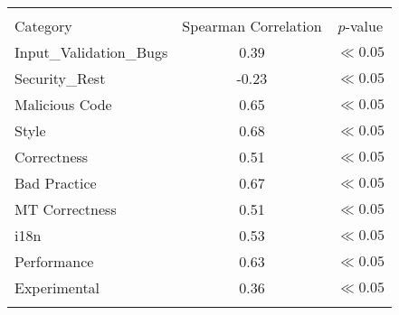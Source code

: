 
\begin{tabular}{lcc}
\hline \\
Category & Spearman Correlation & $p$-value \\ \hline 
Input_Validation_Bugs & 0.39 & $\ll 0.05$\\
Security_Rest & -0.23 & $\ll 0.05$\\
Malicious Code & 0.65 & $\ll 0.05$\\
Style & 0.68 & $\ll 0.05$\\
Correctness & 0.51 & $\ll 0.05$\\
Bad Practice & 0.67 & $\ll 0.05$\\
MT Correctness & 0.51 & $\ll 0.05$\\
i18n & 0.53 & $\ll 0.05$\\
Performance & 0.63 & $\ll 0.05$\\
Experimental & 0.36 & $\ll 0.05$\\
\hline \\
\end{tabular}
